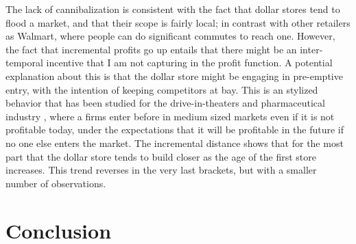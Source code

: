 \documentclass[11.5pt]{article}
\begin{document}
The lack of cannibalization is consistent with the fact that dollar stores tend to flood a market, and that their scope is fairly local; in contrast with other retailers as Walmart, where people can do significant commutes to reach one. However, the fact that incremental profits go up entails that there might be an inter-temporal incentive that I am not capturing in the profit function. A potential explanation about this is that the dollar store might be engaging in pre-emptive entry, with the intention of keeping competitors at bay. This is an stylized behavior that has been studied for the drive-in-theaters and pharmaceutical industry \cite{gil2021preemptive,ellison2011strategic}, where a firms enter before in medium sized markets even if it is not profitable today, under the expectations that it will be profitable in the future if no one else enters the market.  The incremental distance shows that for the most part that the dollar store tends to build closer as the age of the first store increases. This trend reverses in the very last brackets, but with a smaller number of observations. 












\section{Conclusion}
\end{document}
